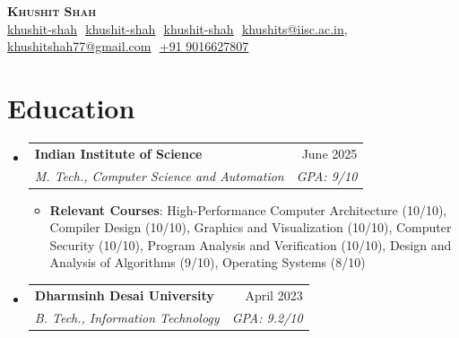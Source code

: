 \documentclass[letterpaper,11pt]{article}
\makeatletter
\newcommand{\resumeItem}[1]{
  \item\small{
    {#1 \vspace{-2pt}}
  }
}
\newcommand{\resumeSubheading}[4]{
  \vspace{-2pt}\item
    \begin{tabular*}{0.97\textwidth}[t]{l@{\extracolsep{\fill}}r}
      \textbf{#1} & #2 \\
      \textit{\small#3} & \textit{\small #4} \\
    \end{tabular*}\vspace{-7pt}
}
\newcommand{\resumeSubHeadingListStart}{\begin{itemize}[leftmargin=0.15in, label={}]}
\newcommand{\resumeSubHeadingListEnd}{\end{itemize}}
\newcommand{\resumeItemListStart}{\begin{itemize}}
\newcommand{\resumeItemListEnd}{\end{itemize}\vspace{-5pt}}
\makeatother
\begin{document}
\begin{flushright}
  \color{gray}
  \item
\end{flushright}

\vspace{-5pt}

\begin{center}
    \textbf{\Huge \scshape Khushit Shah} \\ \vspace{8pt}
    \small 
    \href{https://github.com/khushit-shah}{\underline{khushit-shah}} $  $
    \small 
    \href{https://www.linkedin.com/in/khushit-shah/}{\underline{khushit-shah}} $  $
    \small 
    \href{https://stackoverflow.com/users/8187731/khushit-shah}{\underline{khushit-shah}} $ $
    \href{mailto:khushits@iisc.ac.in}
    {\underline{khushits@iisc.ac.in}}, $ $ 
    \href{mailto:khushitshah77@gmail.com}
    {\underline{khushitshah77@gmail.com}} $ $
    {\underline{+91 9016627807}} $ $ 

\end{center}

\section{Education}
  \resumeSubHeadingListStart
  
    \resumeSubheading
      {Indian Institute of Science}{June 2025}
      {M. Tech., Computer Science and Automation} {GPA: 9/10}
      \resumeItemListStart
            \resumeItem{\textbf{Relevant Courses}: High-Performance Computer Architecture (10/10), Compiler Design (10/10), Graphics and Visualization (10/10), Computer Security (10/10),
            Program Analysis and Verification (10/10), Design and Analysis of Algorithms (9/10), Operating Systems (8/10)}
          \resumeItemListEnd

    \resumeSubheading
      {Dharmsinh Desai University}{April 2023}
      {B. Tech., Information Technology} {GPA: 9.2/10}
      

  \resumeSubHeadingListEnd
\end{document}

